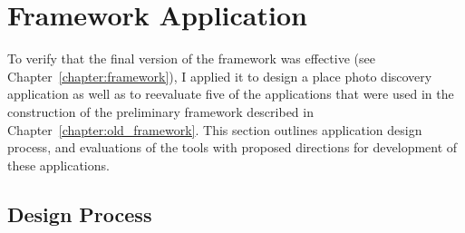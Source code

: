 \chapter{Framework Application}
\label{chapter:application}

To verify that the final version of the framework was effective (see Chapter~\ref{chapter:framework}), I applied it to design a place photo discovery application as well as to reevaluate five of the applications that were used in the construction of the preliminary framework described in Chapter~\ref{chapter:old_framework}. This section outlines application design process, and evaluations of the tools with proposed directions for development of these applications. 

{\section{Design Process}

}%

